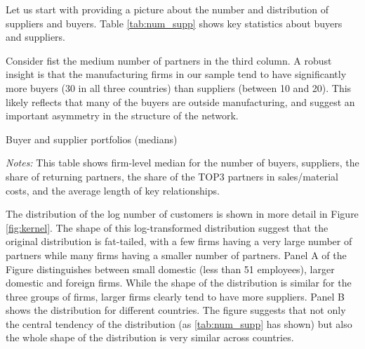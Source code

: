 \documentclass[final, dvipsnames, authoryear,12pt]{elsarticle}
\begin{document}
Let us start with providing a picture about the number and distribution of suppliers and buyers. Table \ref{tab:num_supp} shows key statistics about buyers and suppliers. 

Consider fist the medium number of partners in the third column. A robust insight is that the manufacturing firms in our sample tend to have significantly more buyers (30 in all three countries) than suppliers (between 10 and 20). This likely reflects that many of the buyers are outside manufacturing, and suggest an important asymmetry in the structure of the network. 

\begin{table}[H]
    \caption{Buyer and supplier portfolios (medians)}
    \label{tab:num_supp}
    \centerline{
    }
    {\scriptsize \textit{Notes:} This table shows firm-level median for the number of buyers, suppliers, the share of returning partners, the share of the TOP3 partners in sales/material costs, and the average length of key relationships.}
\end{table}


The distribution of the log number of customers is shown in more detail in Figure \ref{fig:kernel}. The shape of this log-transformed distribution suggest that the original distribution is fat-tailed, with a few firms having a very large number of partners while many firms having a smaller number of partners. Panel A of the Figure distinguishes between small domestic (less than 51 employees), larger domestic and foreign firms. While the shape of the distribution is similar for the three groups of firms, larger firms clearly tend to have more suppliers. Panel B shows the distribution for different countries. The figure suggests that not only the central tendency of the distribution (as \ref{tab:num_supp} has shown) but also the whole shape of the distribution is very similar across countries.
\end{document}
